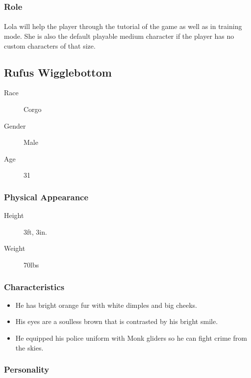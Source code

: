 \subsubsection{Role}

\paragraph{} Lola will help the player through the tutorial of the game as well as in training mode. She is also the default playable medium character if the player has no custom characters of that size.

\subsection{Rufus Wigglebottom}

\begin{description}
    \item[Race] Corgo
    \item[Gender] Male
    \item[Age] 31  
\end{description}

\subsubsection{Physical Appearance}

\begin{description}
    \item[Height] 3ft, 3in.
    \item[Weight] 70lbs
\end{description}

\subsubsection{Characteristics}

\begin{itemize}
    \item He has bright orange fur with white dimples and big cheeks.
    \item His eyes are a soulless brown that is contrasted by his bright smile.
    \item He equipped his police uniform with Monk gliders so he can fight crime from the skies.
\end{itemize}

\subsubsection{Personality}

